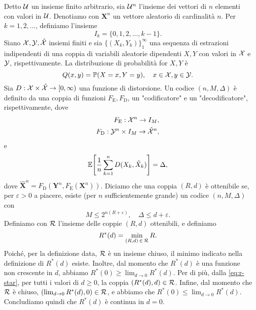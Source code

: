 \begin{thm}
    \label{thm:wz}

    Detto \(\mathcal{U}\) un insieme finito arbitrario, sia \(\mathcal{U}^n\) l'insieme
    dei vettori di \(n\) elementi con valori in \(\mathcal{U}\). Denotiamo con
    \(\bm{X}^n\) un vettore aleatorio di cardinalità \(n\). Per
    \(k=1,2,\dots\), definiamo l'insieme
    \begin{equation}
        I_k = \{0,1,2,\dots,k-1\}.
    \end{equation}
    Siano \(\mathcal{X},\mathcal{Y},\hat{\mathcal{X}}\) insiemi finiti e sia
    \(\{(X_k,Y_k)\}_1^\infty\) una sequenza di estrazioni indipendenti di una
    coppia di variabili aleatorie dipendenti \(X,Y\) con valori in \(\mathcal{X}\)
    e \(\mathcal{Y}\), rispettivamente. La distribuzione di probabilità for \(X,Y\)
    è
    \begin{equation}
        Q(x,y) = \prob{X = x, Y = y}, \quad x \in \set{X}, y \in \set{Y}.
    \end{equation}
    Sia \(D: \mathcal{X}\times\hat{\mathcal{X}} \to [0,\infty)\) una funzione di
    distorsione. Un codice \((n,M,\Delta)\) è definito da una coppia di
    funzioni \(F_\mathrm{E},F_\mathrm{D}\), un "codificatore" e un
    "decodificatore", rispettivamente, dove
    \begin{alignat}{1}
        F_\mathrm{E}: \mathcal{X}^n \to I_M &, \\
        F_\mathrm{D}: \mathcal{Y}^n \times I_M \to \hat{\mathcal{X}}^n &,
    \end{alignat}
    e
    \begin{equation}
        \expect{\frac{1}{n} \sum_{k=1}^n D(X_k,\hat{X}_k)} = \Delta,
    \end{equation}
    dove \(\hat{\bm{X}}^n = F_\mathrm{D}(\bm{Y}^n,F_\mathrm{E}(\bm{X}^n))\).
    Diciamo che una coppia \((R,d)\) è ottenibile se, per \(\varepsilon > 0\) a
    piacere, esiste (per \(n\) sufficientemente grande) un codice
    \((n,M,\Delta)\) con
    \begin{equation}
        M \le 2^{n (R + \varepsilon)}, \quad \Delta \le d + \varepsilon .
    \end{equation}
    Definiamo con \(\mathcal{R}\) l'insieme delle coppie \((R,d)\) ottenibili, e
    definiamo
    \begin{equation}
        R^{*}(d) = \min_{(R,d)\,\in\,\mathcal{R}} R . \label{eq:r-star}
    \end{equation}
    Poiché, per la definizione data, \(\mathcal{R}\) è un insieme chiuso, il minimo
    indicato nella definizione di \(R^{*}(d)\) esiste. Inoltre, dal momento che
    \(R^{*}(d)\) è una funzione non crescente in \(d\), abbiamo \(R^{*}(0) \ge
    \lim_{d\to0} R^{*}(d)\). Per di più, dalla \eqref{eq:r-star}, per tutti i
    valori di \(d \ge 0\), la coppia \((R^{*}(d), d) \in \mathcal{R}\). Infine, dal
    momento che \(\mathcal{R}\) è chiuso, \((\lim_{d\to0} R^{*}(d), 0) \in
    \mathcal{R}\), e abbiamo che \(R^{*}(0) \le \lim_{d\to0} R^{*}(d)\).
    Concludiamo quindi che \(R^{*}(d)\) è continua in \(d = 0\).


\end{thm}
